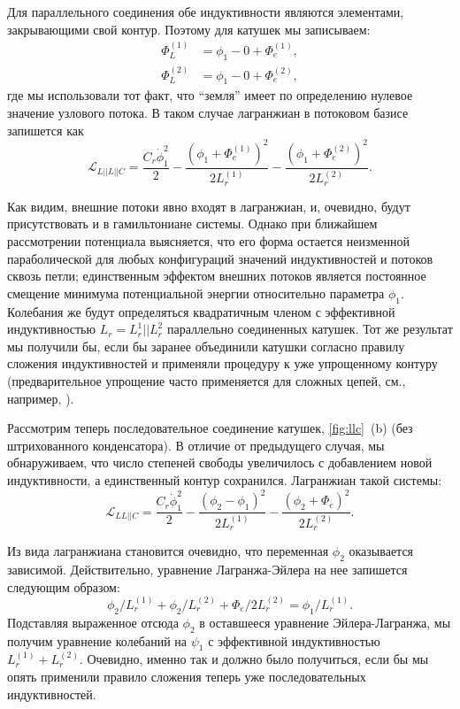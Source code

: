 \documentclass[14pt, a4paper]{extreport}
\numberwithin{equation}{section}
\begin{document}
Для параллельного соединения обе индуктивности являются элементами, закрывающими свой контур. Поэтому для катушек мы записываем:
\begin{align}
	\Phi_L^{(1)} &= \phi_1 - 0 + \Phi_e^{(1)},\\
	\Phi_L^{(2)} &= \phi_1 - 0 + \Phi_e^{(2)},
\end{align}
где мы использовали тот факт, что ``земля'' имеет по определению нулевое значение узлового потока. В таком случае лагранжиан в потоковом базисе запишется как 
\begin{equation}
	\mathcal{L}_{L||L||C} = \frac{C_r \dot\phi_1^2}{2} - \frac{\left(\phi_1 + \Phi_e^{(1)}\right)^2}{2L_r^{(1)}} - \frac{\left(\phi_1 + \Phi_e^{(2)}\right)^2}{2 L_r^{(2)}}.
\end{equation}

Как видим, внешние потоки явно входят в лагранжиан, и, очевидно, будут присутствовать и в гамильтониане системы. Однако при ближайшем рассмотрении потенциала выясняется, что его форма остается неизменной параболической для любых конфигураций значений индуктивностей и потоков сквозь петли; единственным эффектом внешних потоков является постоянное смещение минимума потенциальной энергии относительно параметра $\phi_1$. Колебания же будут определяться квадратичным членом с эффективной индуктивностью $L_r = L_r^1 || L_r^2$ параллельно соединенных катушек. Тот же результат мы получили бы, если бы заранее объединили катушки согласно правилу сложения индуктивностей и применяли процедуру к уже упрощенному контуру (предварительное упрощение часто применяется для сложных цепей, см., например, \cite{koch2007charge}). 

Рассмотрим теперь последовательное соединение катушек, \autoref{fig:llc}~(b) (без штрихованного конденсатора). В отличие от предыдущего случая, мы обнаруживаем, что число степеней свободы увеличилось с добавлением новой индуктивности, а единственный контур сохранился. Лагранжиан такой системы:
\begin{equation}
	\mathcal{L}_{LL||C} = \frac{C_r \dot\phi_1^2}{2} - \frac{(\phi_2 - \phi_1)^2}{2L_r^{(1)}} - \frac{\left(\phi_2+\Phi_e\right)^2}{2 L_r^{(2)}}.\label{eq:ll||c}
\end{equation}

Из вида лагранжиана становится очевидно, что переменная $\phi_2$ оказывается зависимой. Действительно, уравнение Лагранжа-Эйлера на нее запишется следующим образом:
\begin{equation}
	\phi_2/L_r^{(1)} + \phi_2/L_r^{(2)} + \Phi_e/2L_r^{(2)} = \phi_1/L_r^{(1)}.
\end{equation}
Подставляя выраженное отсюда $\phi_2$ в оставшееся уравнение Эйлера-Лагранжа, мы получим уравнение колебаний на $\psi_1$ с эффективной индуктивностью $L_r^{(1)} + L_r^{(2)}$. Очевидно, именно так и должно было получиться, если бы мы опять применили правило сложения теперь уже последовательных индуктивностей.
\end{document}

